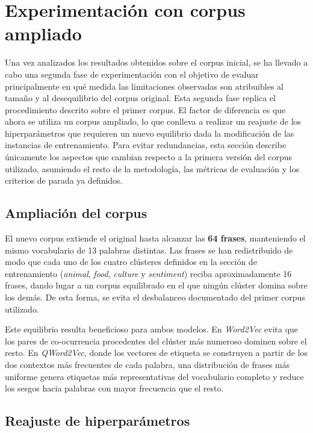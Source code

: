 \section{Experimentación con corpus ampliado}
\label{sec:experimentacion-v2}

Una vez analizados los resultados obtenidos sobre el corpus inicial, se ha llevado a cabo una segunda fase de experimentación con el objetivo de evaluar principalmente en qué medida las limitaciones observadas son atribuibles al tamaño y al desequilibrio del corpus original. Esta segunda fase replica el procedimiento descrito sobre el primer corpus. El factor de diferencia es que ahora se utiliza un corpus ampliado, lo que conlleva a realizar un reajuste de los hiperparámetros que requieren un nuevo equilibrio dada la modificación de las instancias de entrenamiento. Para evitar redundancias, esta sección describe únicamente los aspectos que cambian respecto a la primera versión del corpus utilizado, asumiendo el resto de la metodología, las métricas de evaluación y los criterios de parada ya definidos.

\subsection{Ampliación del corpus}

El nuevo corpus extiende el original hasta alcanzar las \textbf{64 frases}, manteniendo el mismo vocabulario de 13 palabras distintas. Las frases se han redistribuido de modo que cada uno de los cuatro clústeres definidos en la sección de entrenamiento (\textit{animal}, \textit{food}, \textit{culture} y \textit{sentiment}) reciba aproximadamente 16 frases, dando lugar a un corpus equilibrado en el que ningún clúster domina sobre los demás. De esta forma, se evita el desbalanceo documentado del primer corpus utilizado.

Este equilibrio resulta beneficioso para ambos modelos. En \textit{Word2Vec} evita que los pares de co-ocurrencia procedentes del clúster más numeroso dominen sobre el resto. En \textit{QWord2Vec}, donde los vectores de etiqueta se construyen a partir de los dos contextos más frecuentes de cada palabra, una distribución de frases más uniforme genera etiquetas más representativas del vocabulario completo y reduce los sesgos hacia palabras con mayor frecuencia que el resto.

\subsection{Reajuste de hiperparámetros}

